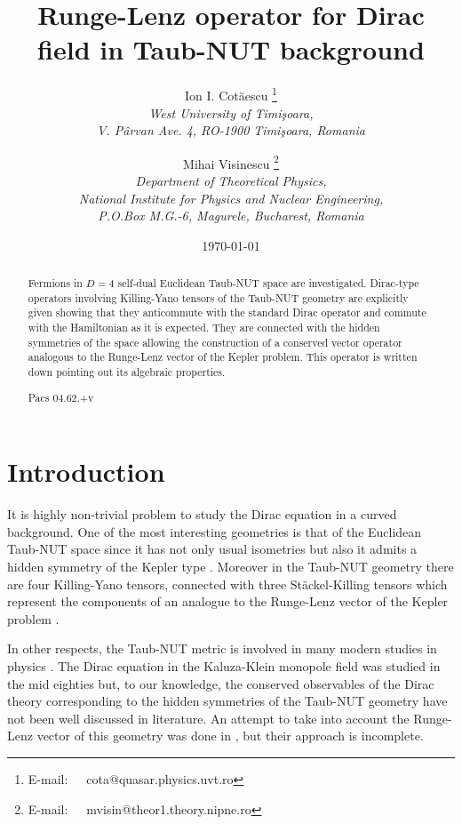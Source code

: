 \documentclass[a4paper,12pt]{article}
\begin{document}
\title{Runge-Lenz operator for Dirac field in 
Taub-NUT background}

\author{Ion I. Cot\u aescu \thanks{E-mail:~~~cota@quasar.physics.uvt.ro}\\ 
{\small \it West University of Timi\c soara,}\\
       {\small \it V. P\^ arvan Ave. 4, RO-1900 Timi\c soara, Romania}
\and
Mihai Visinescu \thanks{E-mail:~~~mvisin@theor1.theory.nipne.ro}\\
{\small \it Department of Theoretical Physics,}\\
{\small \it National Institute for Physics and Nuclear Engineering,}\\
{\small \it P.O.Box M.G.-6, Magurele, Bucharest, Romania}}
\date{\today}

\maketitle

\begin{abstract}
Fermions in $D=4$ self-dual Euclidean Taub-NUT space are investigated. 
Dirac-type operators involving Killing-Yano tensors of the Taub-NUT 
geometry are explicitly given showing that they anticommute with the 
standard Dirac operator and commute with the Hamiltonian  as it is 
expected. They are connected with the hidden symmetries of the space 
allowing the construction of a conserved vector operator analogous to 
the Runge-Lenz vector of the Kepler problem. This operator is written 
down pointing out its algebraic properties.  

Pacs 04.62.+v

\end{abstract}


\section{Introduction}

It is highly non-trivial problem to study the Dirac equation in a curved 
background. One of the most interesting  geometries is that of the Euclidean 
Taub-NUT space  since it has not only usual isometries but also it admits a 
hidden symmetry of the Kepler type  \cite{GM,GRFH}. Moreover in the Taub-NUT 
geometry there are four Killing-Yano tensors, connected with three 
St\" ackel-Killing tensors  which represent the components of an analogue to 
the Runge-Lenz vector of the Kepler problem \cite{GRFH,vH1,VV,MV}.

In other respects, the Taub-NUT metric is involved in many modern studies in 
physics \cite{GM,GRFH,MAH}. The Dirac equation in the Kaluza-Klein monopole 
field was studied in the mid eighties \cite{DIRAC} but, to our knowledge,  
the conserved observables of the Dirac theory corresponding to the hidden 
symmetries of the Taub-NUT geometry have not been well discussed in  
literature. An attempt to take into account the Runge-Lenz vector of this 
geometry was done in \cite{CH}, but their approach is incomplete. 
\end{document}

